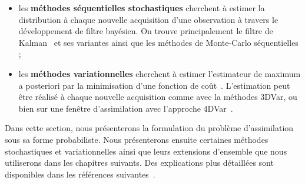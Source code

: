 \begin{itemize}
    \item les \textbf{méthodes séquentielles stochastiques} cherchent à estimer la distribution à chaque nouvelle acquisition d'une observation à travers le développement de filtre bayésien. On trouve principalement le filtre de Kalman~\cite{kalman_new_1960} et ses variantes ainsi que les méthodes de Monte-Carlo séquentielles ;
    \item les \textbf{méthodes variationnelles} cherchent à estimer l'estimateur de maximum a posteriori par la minimisation d'une fonction de coût~\cite{variational_method}. L'estimation peut être réalisé à chaque nouvelle acquisition comme avec la méthodes 3DVar, ou bien sur une fenêtre d'assimilation avec l'approche 4DVar~\cite{talagrand1997assimilation}.
\end{itemize}


Dans cette section, nous présenterons la formulation du problème d'assimilation sous sa forme probabiliste. Nous présenterons ensuite certaines méthodes stochastiques et variationnelles ainsi que leurs extensions d'ensemble que nous utiliserons dans les chapitres suivants. Des explications plus détaillées sont disponibles dans les références suivantes~\cite{law_data_2015,asch_data_2016,evensen_data_2022}.


